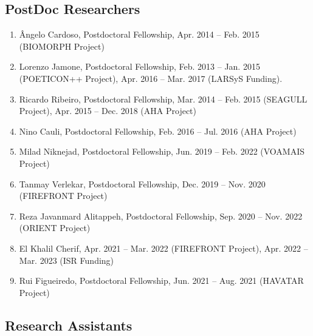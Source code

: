 \subsection{PostDoc Researchers}\label{postdoc-researchers}

\begin{enumerate}
\def\labelenumi{\arabic{enumi}.}
\item
  Ângelo Cardoso, Postdoctoral Fellowship, Apr. 2014 -- Feb. 2015
  (BIOMORPH Project)
\item
  Lorenzo Jamone, Postdoctoral Fellowship, Feb. 2013 -- Jan. 2015
  (POETICON++ Project), Apr. 2016 -- Mar. 2017 (LARSyS Funding).
\item
  Ricardo Ribeiro, Postdoctoral Fellowship, Mar. 2014 -- Feb. 2015
  (SEAGULL Project), Apr. 2015 -- Dec. 2018 (AHA Project)
\item
  Nino Cauli, Postdoctoral Fellowship, Feb. 2016 -- Jul. 2016 (AHA
  Project)
\item
  Milad Niknejad, Postdoctoral Fellowship, Jun. 2019 -- Feb. 2022
  (VOAMAIS Project)
\item
  Tanmay Verlekar, Postdoctoral Fellowship, Dec. 2019 -- Nov. 2020
  (FIREFRONT Project)
\item
  Reza Javanmard Alitappeh, Postdoctoral Fellowship, Sep. 2020 -- Nov.
  2022 (ORIENT Project)
\item
  El Khalil Cherif, Apr. 2021 -- Mar. 2022 (FIREFRONT Project), Apr.
  2022 -- Mar. 2023 (ISR Funding)
\item
  Rui Figueiredo, Postdoctoral Fellowship, Jun. 2021 -- Aug. 2021
  (HAVATAR Project)
\end{enumerate}

\subsection{Research Assistants}\label{research-assistants}

